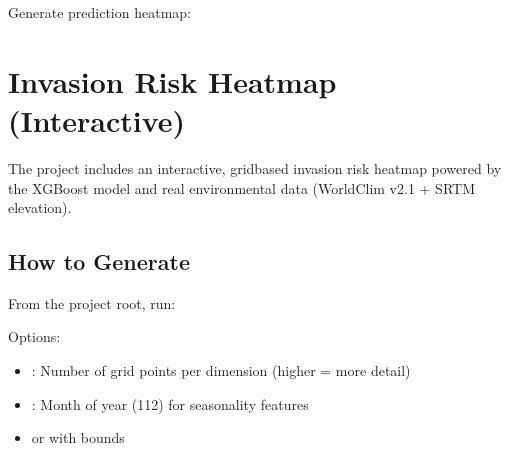 \documentclass[letterpaper,10pt,english]{sphinxmanual}
\begin{document}
\sphinxAtStartPar
Generate prediction heatmap:

\begin{sphinxVerbatim}[commandchars=\\\{\}]
 
\end{sphinxVerbatim}


\section{Invasion Risk Heatmap (Interactive)}
\label{\detokenize{user_guide:invasion-risk-heatmap-interactive}}
\sphinxAtStartPar
The project includes an interactive, grid\sphinxhyphen{}based invasion risk heatmap powered by the XGBoost model and real environmental data (WorldClim v2.1 + SRTM elevation).


\subsection{How to Generate}
\label{\detokenize{user_guide:how-to-generate}}
\sphinxAtStartPar
From the project root, run:

\begin{sphinxVerbatim}[commandchars=\\\{\}]
      
\end{sphinxVerbatim}

\sphinxAtStartPar
Options:
\begin{itemize}
\item {} 
\sphinxAtStartPar
{}: Number of grid points per dimension (higher = more detail)

\item {} 
\sphinxAtStartPar
{}: Month of year (1\sphinxhyphen{}12) for seasonality features

\item {} 
\sphinxAtStartPar
{} or  with  bounds

\end{itemize}
\end{document}
